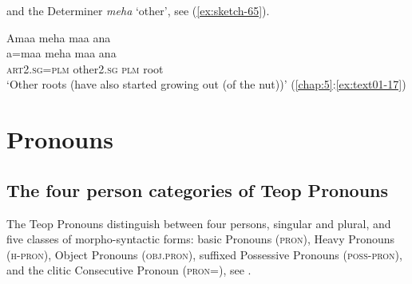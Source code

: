 \documentclass[output=paper]{langscibook}
\begin{document}
\noindent and the Determiner \textit{meha} `other', see (\ref{ex:sketch-65}).\clearpage

\ea\label{ex:sketch-65}
    Amaa meha maa ana\\
    \gll a=maa	meha	maa	ana\\
    \textsc{art}2.\textsc{sg}=\textsc{plm}	other2.\textsc{sg}	\textsc{plm}	root\\
    \glt `Other roots (have also started growing out (of the nut))' (\ref{chap:5}:\ref{ex:text01-17})
\z

\section{Pronouns}\label{sec:pronouns}
\subsection{The four person categories of Teop Pronouns}\label{sec:fourcat}

The Teop Pronouns distinguish between four persons, singular and plural, and five classes of morpho-syntactic forms: basic Pronouns (\textsc{pron}), Heavy Pronouns (\textsc{h}-\textsc{pron}), Object Pronouns (\textsc{obj}.\textsc{pron}), suffixed Possessive Pronouns (\textsc{poss}-\textsc{pron}), and the clitic Consecutive Pronoun (\textsc{pron}=), see .
\end{document}
